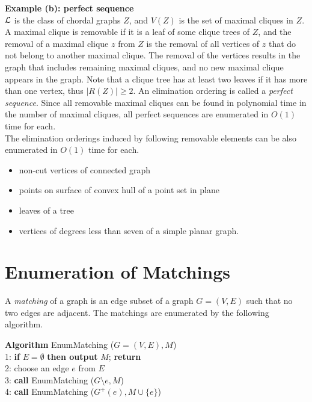\documentclass{llncs}
\begin{document}
\vspace{-1mm}
{\bf Example (b): perfect sequence\cite{perfectseq}}\\
$\cal L$ is the class of chordal graphs $Z$, and $V(Z)$ is the set of
 maximal cliques in $Z$.
A maximal clique is removable if it is a leaf of some clique trees of $Z$,
 and the removal of a maximal clique $z$ from $Z$ is the removal of all
  vertices of $z$ that do not belong to another maximal clique.
The removal of the vertices results in the graph that includes remaining 
 maximal cliques, and no new maximal clique appears in the graph.
Note that a clique tree has at least two leaves if it has more than one 
 vertex, thus $|R(Z)|\ge 2$.
An elimination ordering is called a {\em perfect sequence}.
Since all removable maximal cliques can be found in polynomial
 time in the number of maximal cliques\cite{perfectseq},
 all perfect sequences are enumerated in $O(1)$ time for each.\\

\vspace{-1mm}
The elimination orderings induced by following removable elements 
 can be also enumerated in $O(1)$ time for each.
 
\vspace{-2mm}
\begin{itemize}
\item non-cut vertices of connected graph
\item points on surface of convex hull of a point set in plane
\item leaves of a tree
\item vertices of degrees less than seven of a simple planar graph.
\end{itemize}


\vspace{-4mm}
\section{Enumeration of Matchings}\label{sec:match}
\vspace{-2mm}

A {\it matching} of a graph is an edge subset of a graph $G=(V,E)$
 such that no two edges are adjacent.
The matchings are enumerated by the following algorithm.

\begin{tabbing}
{\bf Algorithm} EnumMatching ($G=(V,E), M$)\\
1: {\bf if} $E = \emptyset$ {\bf then output} $M$; {\bf return}\\
2: choose an edge $e$ from $E$\\
3: {\bf call} EnumMatching ($G\setminus e, M$)\\
4: {\bf call} EnumMatching ($G^+(e), M\cup \{ e\}$)
\end{tabbing}
\end{document}
